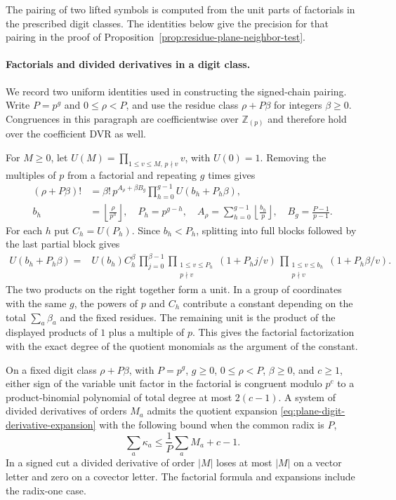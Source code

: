 The pairing of two lifted symbols is computed from the unit parts of factorials in the prescribed digit classes. The identities below give the
precision for that pairing in the proof of
Proposition~\ref{prop:residue-plane-neighbor-test}.
\paragraph{Factorials and divided derivatives in a digit class.}
\label{par:plane-digits}
\hypertarget{source-plane-digits}{}
We record two uniform identities used in constructing the signed-chain
pairing. Write \(P=p^g\) and \(0\le\rho<P\), and use the residue
class \(\rho+P\beta\) for integers \(\beta\ge0\). Congruences in
this paragraph are coefficientwise over \(\mathbb Z_{(p)}\) and
therefore hold over the coefficient DVR as well.

For \(M\ge0\), let \(U(M)=\prod_{1\le v\le M,\,p\nmid v}v\),
with \(U(0)=1\). Removing the multiples of \(p\) from a factorial
and repeating \(g\) times gives
\begin{align*}
 (\rho+P\beta)!&=\beta!\,p^{A_\rho+\beta B_g}
       \prod_{h=0}^{g-1} U(b_h+P_h\beta),\\
 b_h&=\left\lfloor\frac\rho{p^h}\right\rfloor,\quad
 P_h=p^{g-h},\quad A_\rho=\sum_{h=0}^{g-1}\left\lfloor\frac{b_h}{p}\right\rfloor,
 \quad B_g=\frac{P-1}{p-1}.
\end{align*}
For each \(h\) put \(C_h=U(P_h)\). Since \(b_h<P_h\), splitting
into full blocks followed by the last partial block gives
\begin{align*}
 U(b_h+P_h\beta)={}&U(b_h)C_h^\beta\,
 \prod_{j=0}^{\beta-1}\prod_{\substack{1\le v\le P_h\\p\nmid v}}
                (1+P_hj/v)\,
 \prod_{\substack{1\le v\le b_h\\p\nmid v}}(1+P_h\beta/v).
\end{align*}
The two products on the right together form a unit. In a group
of coordinates with the same \(g\), the powers of \(p\) and \(C_h\)
contribute a constant depending on the total \(\sum_a\beta_a\)
and the fixed residues. The remaining unit is the product of
the displayed products of \(1\) plus a multiple of \(p\).
This gives the factorial factorization with the exact degree
of the quotient monomials as the argument of the constant.

\begin{lemma}\label{lem:plane-digit-units-and-cuts}
On a fixed digit class \(\rho+P\beta\), with \(P=p^g\),
\(g\ge0\), \(0\le\rho<P\), \(\beta\ge0\), and \(c\ge1\), either
sign of the variable unit factor in the factorial is congruent
modulo \(p^c\) to a product-binomial polynomial of total degree
at most \(2(c-1)\). A system of divided derivatives of
orders \(M_a\) admits the quotient expansion
\eqref{eq:plane-digit-derivative-expansion} with the following bound when the common radix is \(P\),
\[
 \sum_a\kappa_a\le\frac1P\sum_a M_a+c-1.
\]
 In a signed cut a divided derivative of order
\(|M|\) loses at most \(|M|\) on a vector letter and zero
on a covector letter. The factorial formula and expansions
include the radix-one case.
\end{lemma}

